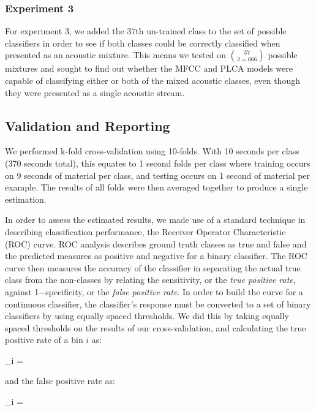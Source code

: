 \documentclass[a4paper,10pt,final]{ThesisStyle}
\begin{document}
\subsubsection{Experiment 3}
For experiment 3, we added the 37th un-trained class to the set of possible classifiers in order to see if both classes could be correctly classified when presented as an acoustic mixture.  This means we tested on $37 \choose 2 = 666$ possible mixtures and sought to find out whether the MFCC and PLCA models were capable of classifying either or both of the mixed acoustic classes, even though they were presented as a single acoustic stream.


\subsection{Validation and Reporting}
\label{sec:ROC}
We performed k-fold cross-validation using 10-folds.  With 10 seconds per class (370 seconds total), this equates to 1 second folds per class where training occurs on 9 seconds of material per class, and testing occurs on 1 second of material per example. The results of all folds were then averaged together to produce a single estimation.

In order to assess the estimated results, we made use of a standard technique in describing classification performance, the Receiver Operator Characteristic (ROC) curve.  ROC analysis describes ground truth classes as true and false and the predicted measures as positive and negative for a binary classifier.  The ROC curve then measures the accuracy of the classifier in separating the actual true class from the non-classes by relating the sensitivity, or the \textit{true positive rate}, against 1$-$specificity, or the \textit{false positive rate}.   In order to build the curve for a continuous classifier, the classifier's response must be converted to a set of binary classifiers by using equally spaced thresholds.  We did this by taking equally spaced thresholds on the results of our cross-validation, and calculating the true positive rate of a bin $i$ as: 

\begin{equationb}
_i = 
\end{equationb}

and the false positive rate as: 

\begin{equationb}
_i = 
\end{equationb}
\end{document}
